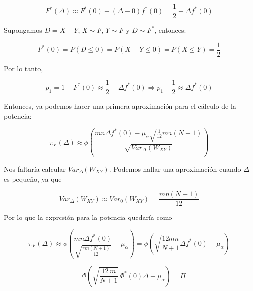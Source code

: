 $$
F^*(\Delta)\approx F^*(0)+(\Delta-0) f^*(0)=\frac{1}{2}+\Delta f^*(0)
$$

Supongamos $D=X-Y$, $X\sim F$, $Y\sim F$ y $D\sim F^*$, entonces:

$$
F^*(0)=P(D\leq 0)=P(X-Y\leq 0)=P(X\leq Y)=\frac{1}{2}
$$

Por lo tanto,

$$
p_1=1-F^*(0)\approx\frac{1}{2}+\Delta f^*(0) \Longrightarrow p_1-\frac{1}{2}\approx \Delta f^*(0)
$$

Entonces, ya podemos hacer una primera aproximación para el cálculo de la potencia:

$$
\pi_F(\Delta)\approx \phi\left(\frac{mn\Delta f^*(0)-\mu_\alpha\sqrt{\frac{1}{12}mn(N+1)}}{\sqrt{Var_\Delta(W_{XY})}}\right)
$$

Nos faltaría calcular $Var_\Delta(W_{XY})$. Podemos hallar una aproximación cuando $\Delta$ es pequeño, ya que 

$$
Var_\Delta(W_{XY})\approx Var_0(W_{XY})=\frac{mn(N+1)}{12}
$$

Por lo que la expresión para la potencia quedaría como

$$
\pi_F(\Delta)\approx\phi\left(\frac{mn\Delta f^*(0)}{\sqrt{\frac{mn(N+1)}{12}}}-\mu_\alpha\right)=\phi\left(\sqrt{\frac{12mn}{N+1}}\Delta f^*(0)-\mu_\alpha\right)
$$

\[
    =\Phi\left(\sqrt{\frac{12 \, m}{N+1}} \, \Phi^*(0) \Delta - \mu_\alpha\right) = \Pi
\]